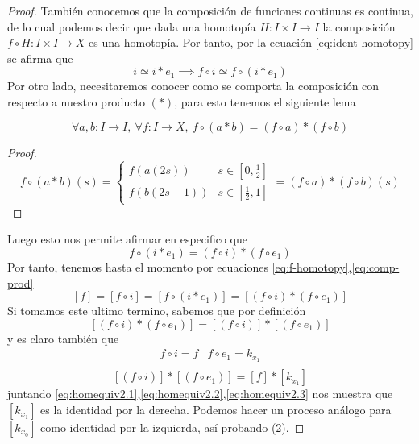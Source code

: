 \begin{proof}
También conocemos que la composición de funciones continuas es
continua, de lo cual podemos decir que dada una homotopía \(H : I \times
I \to I\) la composición \( f \circ H : I \times I \to X\) es una
homotopía. Por tanto, por la ecuación \eqref{eq:ident-homotopy} se
afirma que
\begin{equation}\label{eq:f-homotopy}
i \simeq i * e_1 \implies f \circ i \simeq f \circ \left( i * e_1 \right)
\end{equation}
Por otro lado, necesitaremos conocer como se comporta la composición con
respecto a nuestro producto \(\left( * \right)\), para esto tenemos el
siguiente lema
\begin{lema}
\label{lema:dist-composición-producto}
\[\forall a,b : I \to I,\ \forall f : I \to X,\ f \circ (a * b) = (f
\circ a) * (f \circ b) \]
\end{lema}
\begin{proof}
  \[ f \circ (a*b) (s) =
    \begin{cases}
      f \left( a(2s) \right) & s \in [0,\frac{1}{2}] \\
      f \left( b(2s - 1) \right) & s \in [\frac{1}{2} , 1]
    \end{cases}
    = \left( f \circ a \right) * \left(f \circ b \right) \left( s \right)
  \]
\end{proof}
\noindent Luego esto nos permite afirmar en especifico que
\begin{equation} \label{eq:comp-prod}
  f \circ \left( i * e_1 \right) = (f \circ i) * (f \circ e_1)
\end{equation}
Por tanto, tenemos hasta el momento por ecuaciones
\eqref{eq:f-homotopy},\eqref{eq:comp-prod}
\begin{equation}\label{eq:homequiv2.1}
[f] = [f \circ i] = [f \circ (i * e_1)] = [(f \circ i) * (f \circ e_1)]
\end{equation}
Si tomamos este ultimo termino, sabemos que por definición
\begin{equation}\label{eq:homequiv2.2}
[(f \circ i) * (f \circ e_1)] = [(f \circ i)] * [(f \circ e_1)]
\end{equation}
y es claro también que
\[
  \begin{matrix}
    f \circ i = f & f \circ e_1 = k_{x_1} \\
  \end{matrix}
\]
\begin{equation}\label{eq:homequiv2.3}
[(f \circ i)] * [(f \circ e_1)] = [f] * [k_{x_1}]
\end{equation}
juntando
\eqref{eq:homequiv2.1},\eqref{eq:homequiv2.2},\eqref{eq:homequiv2.3} nos
muestra que \([k_{x_1}]\) es la identidad por la derecha. Podemos
hacer un proceso análogo para \([k_{x_0}]\) como identidad por la
izquierda, así probando (2).


\end{proof}
